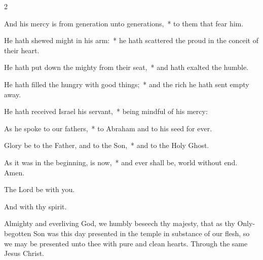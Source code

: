 \documentclass[12pt]{book}
\begin{document}
\begin{paracol}{2}
\begin{enpars}
And his mercy is from generation unto generations,~* to them that fear him.

He hath shewed might in his arm:~* he hath scattered the proud in the conceit of their heart.

He hath put down the mighty from their seat,~* and hath exalted the humble.

He hath filled the hungry with good things;~* and the rich he hath sent empty away.

He hath received Israel his servant,~* being mindful of his mercy:

As he spoke to our fathers,~* to Abraham and to his seed for ever.

Glory be to the Father, and to the Son,~* and to the Holy Ghost.

As it was in the beginning, is now,~* and ever shall be, world without end. Amen.
\end{enpars}
 \end{paracol}


{\noindent \vv The Lord be with you.

\noindent \rr  And with thy spirit.

\noindent 
Almighty and everliving God, we humbly beseech thy majesty, that as thy Only-begotten Son was this day presented in the temple in substance of our flesh, so we may be presented unto thee with pure and clean hearts. Through the same Jesus Christ.}


\end{document}
